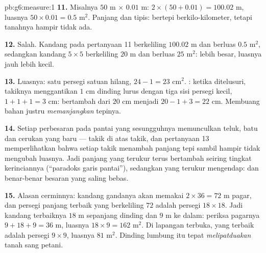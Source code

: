 \begin{solution}{pb:g6:measure:1}
\textbf{11.} Misalnya $50$ m $\times$ $0.01$ m: 
$2 \times (50 + 0.01) = 100.02$ m, luasnya
$50 \times 0.01 = 0.5$ m$^2$. Panjang dan tipis: bertepi
berkilo-kilometer, tetapi tanahnya hampir tidak ada.

\textbf{12.} Salah. Kandang pada pertanyaan 11 berkeliling
$100.02$ m dan berluas $0.5$ m$^2$, sedangkan kandang $5 \times 5$
berkeliling $20$ m dan berluas $25$ m$^2$:  lebih besar,
luasnya jauh lebih kecil.

\textbf{13.} Luasnya: satu persegi satuan hilang,
$24 - 1 = 23$ cm$^2$. : ketika ditelusuri, takiknya
menggantikan $1$ cm dinding lurus dengan tiga sisi persegi kecil,
$1 + 1 + 1 = 3$ cm:  bertambah dari $20$ cm menjadi
$20 - 1 + 3 = 22$ cm. Membuang bahan justru \emph{memanjangkan}
tepinya.

\textbf{14.} Setiap perbesaran pada pantai yang sesungguhnya
memunculkan teluk, batu dan cerukan yang baru --- takik di atas takik,
dan pertanyaan 13 memperlihatkan bahwa setiap takik menambah panjang
tepi sambil hampir tidak mengubah luasnya. Jadi panjang yang terukur
terus bertambah seiring tingkat kerinciannya (``paradoks garis
pantai''), sedangkan  yang terukur mengendap:  dan 
benar-benar besaran yang saling bebas.

\textbf{15.} Alasan cerminnya: kandang gandanya akan memakai
$2 \times 36 = 72$ m pagar, dan persegi panjang terbaik yang
berkeliling $72$ adalah persegi $18 \times 18$. Jadi kandang terbaiknya
$18$ m sepanjang dinding dan $9$ m ke dalam: periksa pagarnya
$9 + 18 + 9 = 36$ m, luasnya $18 \times 9 = 162$ m$^2$. Di lapangan
terbuka, yang terbaik adalah persegi $9 \times 9$, luasnya $81$ m$^2$.
Dinding lumbung itu tepat \emph{melipatduakan} tanah sang petani.

\end{solution}
